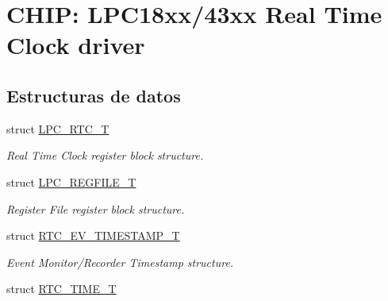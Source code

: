 \hypertarget{group___r_t_c__18_x_x__43_x_x}{}\section{C\+H\+IP\+: L\+P\+C18xx/43xx Real Time Clock driver}
\label{group___r_t_c__18_x_x__43_x_x}
\subsection*{Estructuras de datos}
\begin{DoxyCompactItemize}
\item 
struct \hyperlink{struct_l_p_c___r_t_c___t}{L\+P\+C\+\_\+\+R\+T\+C\+\_\+T}
\begin{DoxyCompactList}\small\item\em Real Time Clock register block structure. \end{DoxyCompactList}\item 
struct \hyperlink{struct_l_p_c___r_e_g_f_i_l_e___t}{L\+P\+C\+\_\+\+R\+E\+G\+F\+I\+L\+E\+\_\+T}
\begin{DoxyCompactList}\small\item\em Register File register block structure. \end{DoxyCompactList}\item 
struct \hyperlink{struct_r_t_c___e_v___t_i_m_e_s_t_a_m_p___t}{R\+T\+C\+\_\+\+E\+V\+\_\+\+T\+I\+M\+E\+S\+T\+A\+M\+P\+\_\+T}
\begin{DoxyCompactList}\small\item\em Event Monitor/\+Recorder Timestamp structure. \end{DoxyCompactList}\item 
struct \hyperlink{struct_r_t_c___t_i_m_e___t}{R\+T\+C\+\_\+\+T\+I\+M\+E\+\_\+T}
\end{DoxyCompactItemize}
